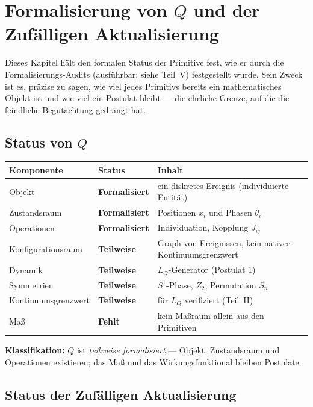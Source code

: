 \documentclass[10pt,twoside,openany]{book}
\begin{document}
\chapter{Formalisierung von $Q$ und der Zufälligen Aktualisierung}
\label{ch:formalization}

Dieses Kapitel hält den formalen Status der Primitive fest, wie er durch die
Formalisierungs-Audits (ausführbar; siehe Teil~V) festgestellt wurde. Sein Zweck ist es,
präzise zu sagen, wie viel jedes Primitivs bereits ein mathematisches Objekt ist und wie
viel ein Postulat bleibt --- die ehrliche Grenze, auf die die feindliche Begutachtung
gedrängt hat.

\section{Status von $Q$}

\begin{center}
\begin{tabular}{lll}
\toprule
Komponente & Status & Inhalt \\
\midrule
Objekt & \textbf{Formalisiert} & ein diskretes Ereignis (individuierte Entität) \\
Zustandsraum & \textbf{Formalisiert} & Positionen $x_i$ und Phasen $\theta_i$ \\
Operationen & \textbf{Formalisiert} & Individuation, Kopplung $J_{ij}$ \\
Konfigurationsraum & \textbf{Teilweise} & Graph von Ereignissen, kein nativer Kontinuumsgrenzwert \\
Dynamik & \textbf{Teilweise} & $L_Q$-Generator (Postulat 1) \\
Symmetrien & \textbf{Teilweise} & $S^1$-Phase, $Z_2$, Permutation $S_n$ \\
Kontinuumsgrenzwert & \textbf{Teilweise} & für $L_Q$ verifiziert (Teil~II) \\
Maß & \textbf{Fehlt} & kein Maßraum allein aus den Primitiven \\
\bottomrule
\end{tabular}
\end{center}

\textbf{Klassifikation:} $Q$ ist \emph{teilweise formalisiert} — Objekt, Zustandsraum und
Operationen existieren; das Maß und das Wirkungsfunktional bleiben Postulate.

\section{Status der Zufälligen Aktualisierung}
\end{document}
